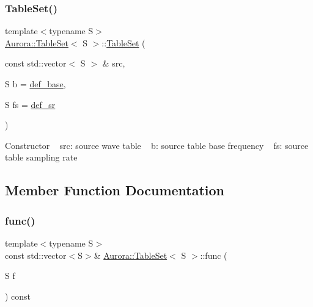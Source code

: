 \subsubsection{\texorpdfstring{Table\+Set()}{TableSet()}\hspace{0.1cm}{\footnotesize\ttfamily [4/4]}}
{\footnotesize\ttfamily template$<$typename S$>$ \\
\hyperlink{class_aurora_1_1_table_set}{Aurora\+::\+Table\+Set}$<$ S $>$\+::\hyperlink{class_aurora_1_1_table_set}{Table\+Set} (\begin{DoxyParamCaption}\item[{const std\+::vector$<$ S $>$ \&}]{src,  }\item[{S}]{b = {\ttfamily \hyperlink{namespace_aurora_acb267dff62f74484893c2d5b679b78bf}{def\+\_\+base}},  }\item[{S}]{fs = {\ttfamily \hyperlink{namespace_aurora_ad49263d809bea98dd422e95bc91bc03e}{def\+\_\+sr}} }\end{DoxyParamCaption})\hspace{0.3cm}{\ttfamily [inline]}}

Constructor ~\newline
src\+: source wave table ~\newline
b\+: source table base frequency ~\newline
fs\+: source table sampling rate 

\subsection{Member Function Documentation}
\mbox{\label{class_aurora_1_1_table_set_afd4c6f1ba81f6ae1feb42eabd95c1b7f}} 
\subsubsection{\texorpdfstring{func()}{func()}\hspace{0.1cm}{\footnotesize\ttfamily [1/2]}}
{\footnotesize\ttfamily template$<$typename S$>$ \\
const std\+::vector$<$S$>$\& \hyperlink{class_aurora_1_1_table_set}{Aurora\+::\+Table\+Set}$<$ S $>$\+::func (\begin{DoxyParamCaption}\item[{S}]{f }\end{DoxyParamCaption}) const\hspace{0.3cm}{\ttfamily [inline]}}


